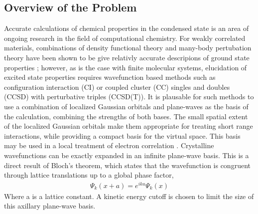 \documentclass[letterpaper, 12pt]{article}
\begin{document}
\subsection{Overview of the Problem}
Accurate calculations of chemical properties in the condensed state is an area of ongoing research in the field of computational chemistry. For weakly correlated materials, combinations of density functional theory and many-body pertubation theory have been shown to be give relativly accurate descripions of ground state properties \cite{solidCCSD}; however, as is the case with finite molecular systems, elucidation of excited state properties requires wavefunction based methods such as configuration interaction (CI) or coupled cluster (CC) singles and doubles (CCSD) with perturbative triples (CCSD(T)). It is plausable for such methods to use a combination of localized Gaussian orbitals and plane-waves as the basis of the calculation, combining the strengths of both bases. The small spatial extent of the localized Gaussian orbitals make them appropriate for treating short range interactions, while providing a compact basis for the virtual space. This basis may be used in a local treatment of electron correlation \cite{Booth}. Crystalline wavefunctions can be exactly expanded in an infinite plane-wave basis. This is a direct result of Bloch's theorem, which states that the wavefunction is congruent through lattice translations up to a global phase factor, 
\begin{align*}
\Psi_k(x+a)=e^{ika}\Psi_k(x)
\end{align*}
Where a is a lattice constant. A kinetic energy cutoff is chosen to limit the size of this axillary plane-wave basis.
\end{document}
